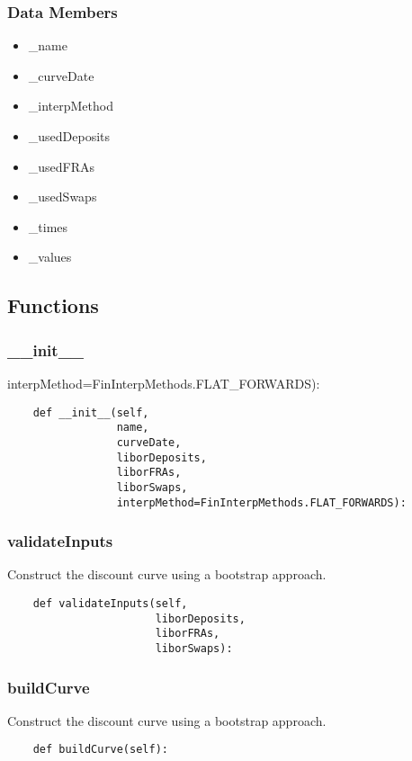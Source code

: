 \documentclass[twoside,11pt]{book}
\begin{document}
\subsubsection*{Data Members}
\begin{itemize}
\item{\_name}
\item{\_curveDate}
\item{\_interpMethod}
\item{\_usedDeposits}
\item{\_usedFRAs}
\item{\_usedSwaps}
\item{\_times}
\item{\_values}
\end{itemize}

\subsection*{Functions}

\subsubsection*{{\bf \_\_init\_\_}}
interpMethod=FinInterpMethods.FLAT\_FORWARDS): 

\begin{lstlisting}
    def __init__(self,
                 name,
                 curveDate,
                 liborDeposits,
                 liborFRAs,
                 liborSwaps,
                 interpMethod=FinInterpMethods.FLAT_FORWARDS):
\end{lstlisting}

\subsubsection*{{\bf validateInputs}}
Construct the discount curve using a bootstrap approach.  

\begin{lstlisting}
    def validateInputs(self,
                       liborDeposits,
                       liborFRAs,
                       liborSwaps):
\end{lstlisting}

\subsubsection*{{\bf buildCurve}}
Construct the discount curve using a bootstrap approach.  

\begin{lstlisting}
    def buildCurve(self):
\end{lstlisting}
\end{document}
